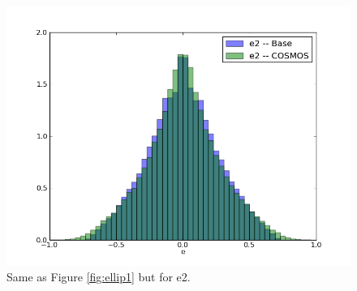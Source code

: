 \documentclass[]{article}
\begin{document}
{\begin{figure}[H]
\centering
\includegraphics[width=5in]{validation_figures/e2_hist.png}
\caption{Same as Figure \ref{fig:ellip1} but for e2.\label{fig:ellip2}}
\end{figure}

}
\end{document}
